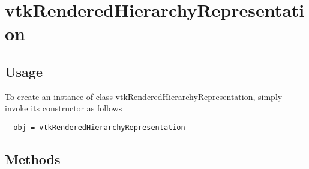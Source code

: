 \section{vtkRenderedHierarchyRepresentation}

\subsection{Usage}


To create an instance of class vtkRenderedHierarchyRepresentation, simply
invoke its constructor as follows
\begin{verbatim}
  obj = vtkRenderedHierarchyRepresentation
\end{verbatim}
\subsection{Methods}

